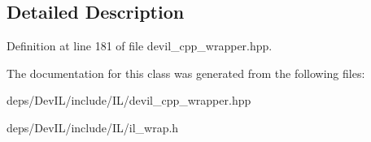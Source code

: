 \subsection{Detailed Description}


Definition at line 181 of file devil\+\_\+cpp\+\_\+wrapper.\+hpp.



The documentation for this class was generated from the following files\+:\begin{DoxyCompactItemize}
\item 
deps/\+Dev\+I\+L/include/\+I\+L/devil\+\_\+cpp\+\_\+wrapper.\+hpp\item 
deps/\+Dev\+I\+L/include/\+I\+L/il\+\_\+wrap.\+h\end{DoxyCompactItemize}
